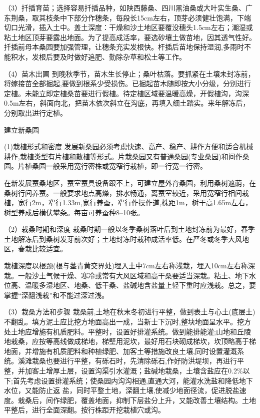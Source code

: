 \documentclass{ctexbook}
\begin{document}
（3）扦插育苗；选择容易扦插品种，如陕西藤桑、四川黑油桑或大叶实生桑、广东荆桑，取其枝条中下部分作穗条，每段长15cm左右，顶芽必须健壮饱满，下端切口光滑，插入土中。盖土深度：干燥和沙土地区要覆没穗头1.5cm左右；潮湿或粘土地区顶芽要露出地面。为了提高成活率，要选砂壤土做苗地，因其透气性好。扦插前母本桑园要加强管理，让穗条充实发根快。杆插后苗地保持湿润,多雨时不能积水，发根后要及时做好追肥、勤除杂草和松土等工作。

（4）苗木出圃 到晚秋季节，苗木生长停止；桑叶枯落。要抓紧在土壤未封冻前，将嫁接苗全部掘起,要做到根系少受损伤。已掘起苗木随即按大小分级，分别进行定植。未能立即定植桑苗要进行假植。待定植区域要温暖高燥，开假植沟，沟深0.5m左右，斜面向北，把苗木依次斜立在沟底，再填入细土踏实。来年解冻后，分别取出进行定植。

建立新桑园

(1)栽植形式和密度 发展新桑园必须考虑快速、高产、稳产、耕作方便和适合机械耕作,栽植类型有片植和散植等形式。片栽桑园又有普通桑园(专业桑园)和间作桑园。片植桑园一般采用宽行密株或宽窄行栽植，即一行宽一行密。

在新发展蚕桑地区，蚕室蚕具设备跟不上，可建立屋外育桑园，利用桑树遮荫，在桑树行间养蚕。一般要求地点高燥，排水畅通，离蚕室较近，采用宽窄行相间栽植，宽行2m，窄行1.33m,宽行养蚕，窄行作操作道,株距1m，树干高1.65m左右，树型养成后横伏攀条。每亩可养蚕种8--10张。

（2）栽桑时期和深度 栽桑时期一般以冬季桑树落叶后到土地封冻前为最好，春季土地解冻后到桑树发芽前次好；土地封冻时栽种成活率低。在严冬或冬季大风地区，春栽比较适宜。

栽植深度以根颈(根与茎青黄交界处)埋入土中7cm左右称浅栽，埋入10cm左右称深栽。一般沙土气候干燥、寒冷或常有大风区域和高干桑要适当深栽。粘土、地下水位高、温暖多湿地区、地桑、低干桑、盐碱地含盐量上轻下重时应浅栽。总之，要掌握“深翻浅栽”和不能过深过浅。

（3）栽桑方法和步骤 栽桑前,土地在秋末冬初进行平整，做到表土与心土(底层土)不翻乱。填方泥土应比挖方地面高出一成，当新士下沉时,整块地面呈水平。挖方处土地应增施有机质肥料。平整时，设置好排灌系统。做到能排能灌;山地和丘陵地栽桑，应按等高线做成梯地，梯壁用泥坎，最好用石块砌成梯坎，坎顶略高于梯地面，并增施有机质肥料和种植绿肥、加客土等措施改良土壤,同时设置灌溉系统。溪滩栽桑也要进行平整，有砾石时，先清除砾石,作好防洪堤坝，再进行平整，并加客土增厚土层，设置沟渠引水灌溉；盐碱地栽桑，土壤含盐应在0.2\%以下;首先考虑设置排灌系统；使桑园内沟沟相通,直通大河，能灌水洗盐和降低地下水位，又能防止返
盐，同时平整土地，深翻土壤,使减少地面径流，促进脱盐速度。栽桑后，间作绿肥，覆盖地面，抑制下层盐分上升，又能改善土壤结构。土地平整后，进行全面深翻。按行株距开挖栽植穴或沟。
\end{document}
